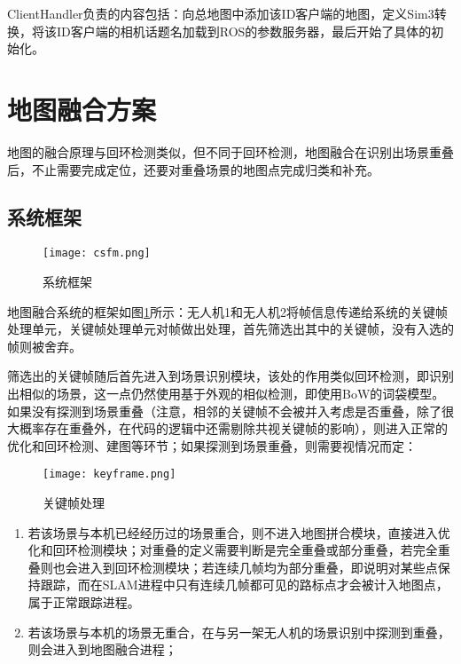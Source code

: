 ClientHandler负责的内容包括：向总地图中添加该ID客户端的地图，定义Sim3转换，将该ID客户端的相机话题名加载到ROS的参数服务器，最后开始了具体的初始化。





\section{地图融合方案}

地图的融合原理与回环检测类似，但不同于回环检测，地图融合在识别出场景重叠后，不止需要完成定位，还要对重叠场景的地图点完成归类和补充。

\subsection{系统框架} \label{3.4.0/}

\begin{figure}[!ht]
	\centering
	\texttt{[image: csfm.png]}
	\caption{系统框架}
	\label{fig13}
\end{figure}

地图融合系统的框架如图\ref{fig13}所示：无人机1和无人机2将帧信息传递给系统的关键帧处理单元，关键帧处理单元对帧做出处理，首先筛选出其中的关键帧，没有入选的帧则被舍弃。

筛选出的关键帧随后首先进入到场景识别模块，该处的作用类似回环检测，即识别出相似的场景，这一点仍然使用基于外观的相似检测，即使用BoW的词袋模型。如果没有探测到场景重叠（注意，相邻的关键帧不会被并入考虑是否重叠，除了很大概率存在重叠外，在代码的逻辑中还需剔除共视关键帧的影响），则进入正常的优化和回环检测、建图等环节；如果探测到场景重叠，则需要视情况而定\cite{forster2013collaborative}：

\begin{figure}[!ht]
	\centering
	\texttt{[image: keyframe.png]}
	\caption{关键帧处理}
	\label{fig-keyframe}
\end{figure}

\begin{enumerate}
	\item 若该场景与本机已经经历过的场景重合，则不进入地图拼合模块，直接进入优化和回环检测模块；对重叠的定义需要判断是完全重叠或部分重叠，若完全重叠则也会进入到回环检测模块；若连续几帧均为部分重叠，即说明对某些点保持跟踪，而在SLAM进程中只有连续几帧都可见的路标点才会被计入地图点，属于正常跟踪进程。
	\item 若该场景与本机的场景无重合，在与另一架无人机的场景识别中探测到重叠，则会进入到地图融合进程；
\end{enumerate}


